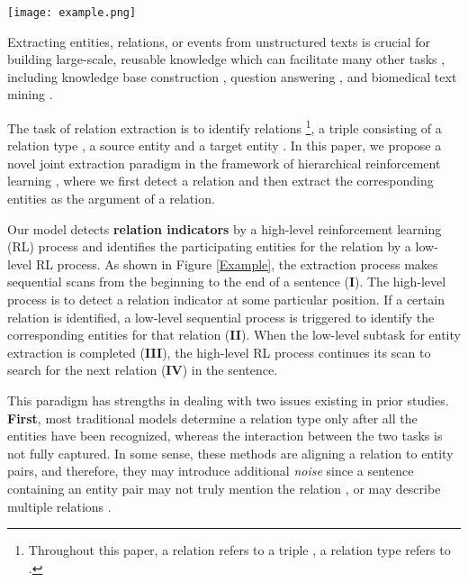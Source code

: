 \documentclass[letterpaper]{article} \usepackage{aaai19}  \usepackage{times}  \usepackage{helvet}  \usepackage{courier}  \usepackage{url}  \usepackage{graphicx}  \frenchspacing  \setlength{\pdfpagewidth}{8.5in}  \setlength{\pdfpageheight}{11in}  \usepackage{amsfonts}
\theoremstyle{definition}
\begin{document}
\begin{figure*}[!tp]
    \centering
    \texttt{[image: example.png]}
    \caption{An example sentence which has two {\bf overlapping relations} (\textit{Steve Belichick}, \texttt{parent-children}, \textit{Bill Belichick}), (\textit{Steve Belichick}, \texttt{place-of-death}, \textit{Annapolis}). The solid arrow indicates the high-level relation detection process, and the dashed arrow for low-level entity extraction. The dotted arrow marks a transition between the two processes. This example shows how overlapping relations are extracted (\textit{Steve Blichick} is included in both triples).}
    \label{Example}
\end{figure*}

Extracting entities, relations, or events from unstructured texts is crucial for building large-scale, reusable knowledge which can facilitate many other tasks \cite{mintz2009distant,nadeau2007survey}, including knowledge base construction \cite{dong2014knowledge,luan2018multi}, question answering \cite{fader2014open}, and biomedical text mining \cite{huang2015community}. 




The task of relation extraction is to identify relations \footnote{Throughout this paper, a relation refers to a triple , a relation type refers to .}, a triple consisting of a relation type , a source entity  and a target entity . In this paper, we propose a novel joint extraction paradigm in the framework of hierarchical reinforcement learning \cite{sutton1999between}, where we first detect a relation and then extract the corresponding entities as the argument of a relation. 


Our model detects {\bf relation indicators} by a high-level reinforcement learning (RL) process and identifies the participating entities for the relation by a low-level RL process.  
As shown in Figure \ref{Example},
the extraction process makes sequential scans from the beginning to the end of a sentence (\textbf{I}). The high-level process is to detect a relation indicator at some particular position. 
If a certain relation is identified, a low-level sequential process is triggered to identify the corresponding entities for that relation (\textbf{II}). 
When the low-level subtask for entity extraction is completed (\textbf{III}), the high-level RL process continues its scan to search for the next relation (\textbf{IV}) in the sentence.


This paradigm has strengths in dealing with two issues existing in prior studies. 
\textbf{First}, most traditional models \cite{gormley2015improved,hoffmann2011knowledge,miwa2016end} determine a relation type only after all the entities have been recognized, whereas the interaction between the two tasks is not fully captured. In some sense, these methods are aligning a relation to entity pairs, and therefore, they may introduce additional \textit{noise} since a sentence containing an entity pair may not truly mention the relation \cite{zhang2013towards}, or may describe multiple relations \cite{takamatsu2012reducing}. 
\end{document}
